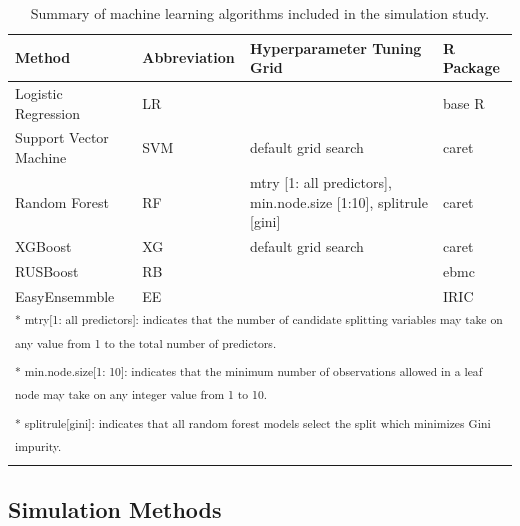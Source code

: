 \documentclass[AMA,STIX1COL,]{WileyNJD-v2}
\begin{document}
\begin{table}[!h]

\caption{\label{tab:algs}Summary of machine learning algorithms included in the simulation study.}
\centering
\begin{tabular}[t]{llll}
\toprule
Method & Abbreviation & Hyperparameter Tuning Grid & R Package\\
\midrule
Logistic Regression & LR &  & base R \cite{r}\\
\addlinespace
Support Vector Machine & SVM & default grid search & caret \cite{caret}\\
\addlinespace
Random Forest & RF & mtry [1: all predictors], min.node.size [1:10], splitrule [gini] & caret \cite{caret}\\
\addlinespace
XGBoost & XG & default grid search & caret \cite{caret}\\
\addlinespace
RUSBoost & RB &  & ebmc \cite{ebmc}\\
\addlinespace
EasyEnsemmble & EE &  & IRIC \cite{iric}\\
\bottomrule
\multicolumn{4}{l}{\rule{0pt}{1em}\textsuperscript{* mtry[1: all predictors]: indicates that the number of candidate splitting variables may take on any value from 1 to the total number of predictors.}}\\
\multicolumn{4}{l}{\rule{0pt}{1em}\textsuperscript{* min.node.size[1: 10]: indicates that the minimum number of observations allowed in a leaf node may take on any integer value from 1 to 10.}}\\
\multicolumn{4}{l}{\rule{0pt}{1em}\textsuperscript{* splitrule[gini]: indicates that all random forest models select the split which minimizes Gini impurity.}}\\
\end{tabular}
\end{table}

\hypertarget{simulation-methods}{%
\subsection{Simulation Methods}\label{simulation-methods}}
\end{document}
